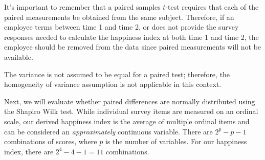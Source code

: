 \documentclass[]{book}
\begin{document}
It's important to remember that a paired samples \(t\)-test requires that each of the paired measurements be obtained from the same subject. Therefore, if an employee terms between time 1 and time 2, or does not provide the survey responses needed to calculate the happiness index at both time 1 and time 2, the employee should be removed from the data since paired measurements will not be available.

The variance is not assumed to be equal for a paired test; therefore, the homogeneity of variance assumption is not applicable in this context.

Next, we will evaluate whether paired differences are normally distributed using the Shapiro Wilk test. While individual survey items are measured on an ordinal scale, our derived happiness index is the average of multiple ordinal items and can be considered an \emph{approximately} continuous variable. There are \(2^p - p - 1\) combinations of scores, where \(p\) is the number of variables. For our happiness index, there are \(2^4 - 4 - 1 = 11\) combinations.
\end{document}
